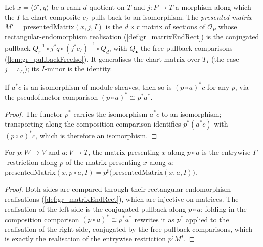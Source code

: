 \begin{definition}
  \label{def:gr_presentedMatrix}
  Let \(x = \langle \mathcal{F}, q\rangle\) be a rank-\(d\) quotient on \(T\) and \(j : P \to
  T\) a morphism along which the \(I\)-th chart composite \(c_I\) pulls back to an isomorphism.
  The \emph{presented matrix} \(M^I = \mathrm{presentedMatrix}(x, j, I)\) is the \(d\times r\)
  matrix of sections of \(\mathcal{O}_P\) whose rectangular-endomorphism realisation
  (\cref{def:gr_matrixEndRect}) is the conjugated pullback
  \(Q_r^{-1}\circ j^{*}q \circ (j^{*}c_I)^{-1}\circ Q_d\), with \(Q_\bullet\) the free-pullback
  comparisons (\cref{lem:gr_pullbackFreeIso}). It generalises the chart matrix over \(T_I\)
  (the case \(j = \iota_{T_I}\)); its \(I\)-minor is the identity.
\end{definition}

\begin{lemma}
  \label{lem:gr_isIso_pullback_map_comp}
  If \(a^{*}c\) is an isomorphism of module sheaves, then so is \((p\circ a)^{*}c\) for any
  \(p\), via the pseudofunctor comparison \((p\circ a)^{*}\cong p^{*}a^{*}\).
\end{lemma}
\begin{proof}

\leanok
  The functor \(p^{*}\) carries the isomorphism \(a^{*}c\) to an isomorphism; transporting
  along the composition comparison identifies \(p^{*}(a^{*}c)\) with \((p\circ a)^{*}c\),
  which is therefore an isomorphism.
\end{proof}

\begin{lemma}
  \label{lem:gr_presentedMatrix_comp}
  For \(p : W \to V\) and \(a : V \to T\), the matrix presenting \(x\) along \(p\circ a\) is
  the entrywise \(\Gamma\)-restriction along \(p\) of the matrix presenting \(x\) along \(a\):
  \(\mathrm{presentedMatrix}(x, p\circ a, I) = p^{\sharp}\bigl(\mathrm{presentedMatrix}(x,
  a, I)\bigr)\).
\end{lemma}
\begin{proof}
  \leanok
  Both sides are compared through their rectangular-endomorphism realisations
  (\cref{def:gr_matrixEndRect}), which are injective on matrices. The realisation of the left
  side is the conjugated pullback along \(p\circ a\); folding in the composition comparison
  \((p\circ a)^{*}\cong p^{*}a^{*}\) rewrites it as \(p^{*}\) applied to the realisation of the
  right side, conjugated by the free-pullback comparisons, which is exactly the realisation of
  the entrywise restriction \(p^{\sharp}M^I\).
\end{proof}

